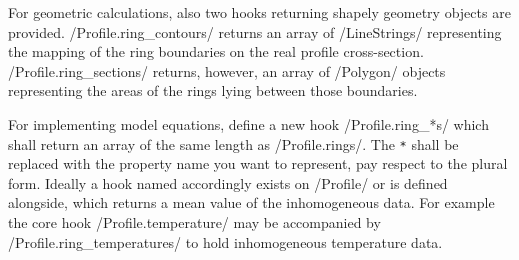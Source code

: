 \documentclass[11pt]{PyRollDocs}
\begin{document}
    For geometric calculations, also two hooks returning shapely geometry objects are provided.
    \py/Profile.ring_contours/ returns an array of \py/LineStrings/ representing the mapping of the ring boundaries on the real profile cross-section.
    \py/Profile.ring_sections/ returns, however, an array of \py/Polygon/ objects representing the areas of the rings lying between those boundaries.

    For implementing model equations, define a new hook \py/Profile.ring_*s/ which shall return an array of the same length as \py/Profile.rings/.
    The \texttt{*} shall be replaced with the property name you want to represent, pay respect to the plural form.
    Ideally a hook named accordingly exists on \py/Profile/ or is defined alongside, which returns a mean value of the inhomogeneous data.
    For example the core hook \py/Profile.temperature/ may be accompanied by \py/Profile.ring_temperatures/ to hold inhomogeneous temperature data.

    \printbibliography
\end{document}
